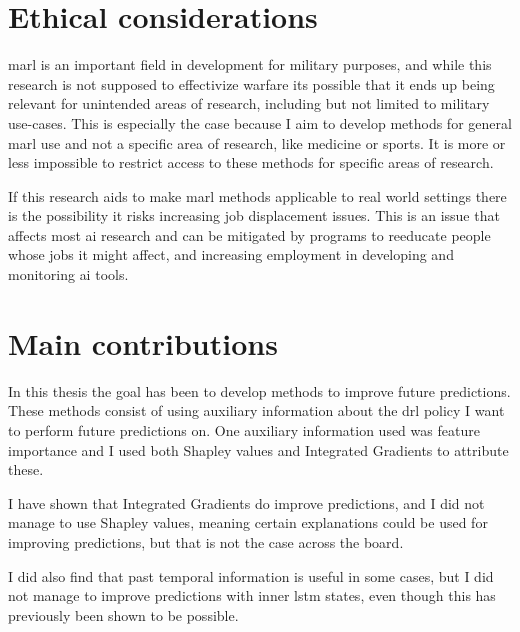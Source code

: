 \documentclass[UKenglish]{uiomasterthesis}
\begin{document}
\section{Ethical considerations}
\ac{marl} is an important field in development for military purposes\cite{military_marl}, and while this research is not supposed to effectivize warfare its possible that it ends up being relevant for unintended areas of research, including but not limited to military use-cases. This is especially the case because I aim to develop methods for general \ac{marl} use and not a specific area of research, like medicine or sports. It is more or less impossible to restrict access to these methods for specific areas of research.

If this research aids to make \ac{marl} methods applicable to real world settings there is the possibility it risks increasing job displacement issues. This is an issue that affects most \ac{ai} research and can be mitigated by programs to reeducate people whose jobs it might affect, and increasing employment in developing and monitoring \ac{ai} tools.


\section{Main contributions}
In this thesis the goal has been to develop methods to improve future predictions. These methods consist of using auxiliary information about the \ac{drl} policy I want to perform future predictions on. One auxiliary information used was feature importance and I used both Shapley values and Integrated Gradients to attribute these. 

I have shown that Integrated Gradients do improve predictions, and I did not manage to use Shapley values, meaning certain explanations could be used for improving predictions, but that is not the case across the board.

I did also find that past temporal information is useful in some cases, but I did not manage to improve predictions with inner \ac{lstm} states, even though this has previously been shown to be possible.
\end{document}
